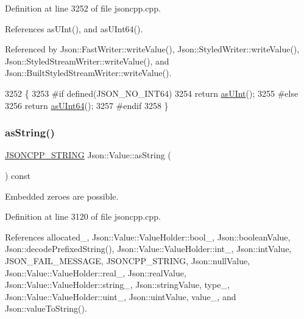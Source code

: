 Definition at line 3252 of file jsoncpp.\+cpp.



References as\+U\+Int(), and as\+U\+Int64().



Referenced by Json\+::\+Fast\+Writer\+::write\+Value(), Json\+::\+Styled\+Writer\+::write\+Value(), Json\+::\+Styled\+Stream\+Writer\+::write\+Value(), and Json\+::\+Built\+Styled\+Stream\+Writer\+::write\+Value().


\begin{DoxyCode}
3252                                        \{
3253 \textcolor{preprocessor}{#if defined(JSON\_NO\_INT64)}
3254   \textcolor{keywordflow}{return} \hyperlink{class_json_1_1_value_a74b305583ec3aacf4f9dd06e799dc265}{asUInt}();
3255 \textcolor{preprocessor}{#else}
3256   \textcolor{keywordflow}{return} \hyperlink{class_json_1_1_value_a0e44a5a4cd0c099f9570dfa25813eb60}{asUInt64}();
3257 \textcolor{preprocessor}{#endif}
3258 \}
\end{DoxyCode}
\mbox{\label{class_json_1_1_value_ae3f9b0d38f820ccdd8888aa92ea6e792}} 
\subsubsection{\texorpdfstring{as\+String()}{asString()}}
{\footnotesize\ttfamily \hyperlink{json_8h_a1e723f95759de062585bc4a8fd3fa4be}{J\+S\+O\+N\+C\+P\+P\+\_\+\+S\+T\+R\+I\+NG} Json\+::\+Value\+::as\+String (\begin{DoxyParamCaption}{ }\end{DoxyParamCaption}) const}



Embedded zeroes are possible. 



Definition at line 3120 of file jsoncpp.\+cpp.



References allocated\+\_\+, Json\+::\+Value\+::\+Value\+Holder\+::bool\+\_\+, Json\+::boolean\+Value, Json\+::decode\+Prefixed\+String(), Json\+::\+Value\+::\+Value\+Holder\+::int\+\_\+, Json\+::int\+Value, J\+S\+O\+N\+\_\+\+F\+A\+I\+L\+\_\+\+M\+E\+S\+S\+A\+GE, J\+S\+O\+N\+C\+P\+P\+\_\+\+S\+T\+R\+I\+NG, Json\+::null\+Value, Json\+::\+Value\+::\+Value\+Holder\+::real\+\_\+, Json\+::real\+Value, Json\+::\+Value\+::\+Value\+Holder\+::string\+\_\+, Json\+::string\+Value, type\+\_\+, Json\+::\+Value\+::\+Value\+Holder\+::uint\+\_\+, Json\+::uint\+Value, value\+\_\+, and Json\+::value\+To\+String().



